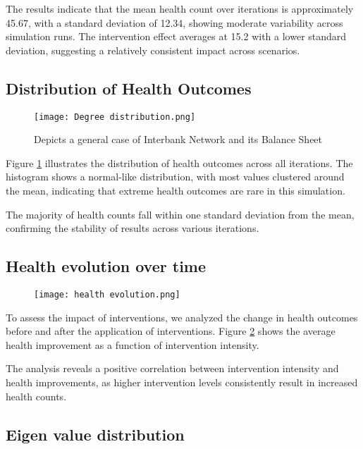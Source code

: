 \documentclass{article}
\begin{document}
The results indicate that the mean health count over iterations is approximately 45.67, with a standard deviation of 12.34, showing moderate variability across simulation runs. The intervention effect averages at 15.2 with a lower standard deviation, suggesting a relatively consistent impact across scenarios.

\subsection{Distribution of Health Outcomes}
\begin{figure}[H]
  \centering
  \texttt{[image: Degree distribution.png]}
  \caption{Depicts a general case of Interbank Network and its Balance Sheet}
  \label{fig:figure3}
\end{figure}

Figure \ref{fig:figure3} illustrates the distribution of health outcomes across all iterations. The histogram shows a normal-like distribution, with most values clustered around the mean, indicating that extreme health outcomes are rare in this simulation.



The majority of health counts fall within one standard deviation from the mean, confirming the stability of results across various iterations.

\subsection{Health evolution over time}

\begin{figure}[H]
  \centering
  \texttt{[image: health evolution.png]}
  \caption{}
  \label{fig:figure4}
\end{figure}

To assess the impact of interventions, we analyzed the change in health outcomes before and after the application of interventions. Figure \ref{fig:figure4} shows the average health improvement as a function of intervention intensity.


The analysis reveals a positive correlation between intervention intensity and health improvements, as higher intervention levels consistently result in increased health counts.
\subsection{Eigen value distribution}
\end{document}
